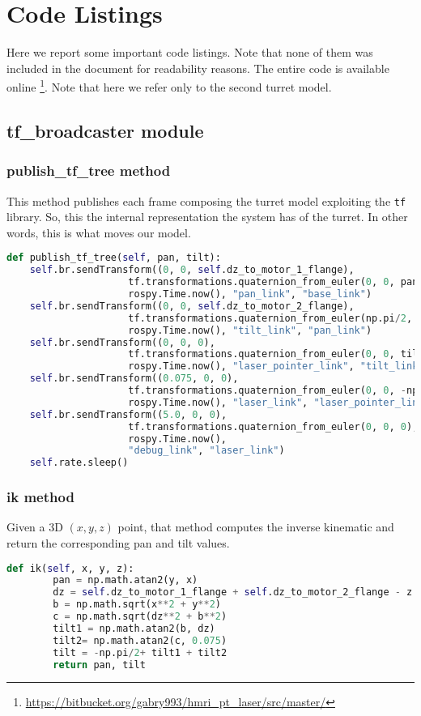 \chapter{Code Listings}

\label{Appen:B}
Here we report some important code listings. Note that none of them was included in the document for readability reasons. The entire code is available online \footnote{\url{https://bitbucket.org/gabry993/hmri_pt_laser/src/master/}}. Note that here we refer only to the second turret model.
\section*{tf\_broadcaster module}\label{sec:tfbroadcaster}
\subsection*{publish\_tf\_tree method}
This method publishes each frame composing the turret model exploiting the \texttt{tf} library. So, this the internal representation the system has of the turret. In other words, this is what moves our  model.
\begin{lstlisting}[caption={Publish Turret tf Tree},label={lst:tftree},language=Python]
def publish_tf_tree(self, pan, tilt):
    self.br.sendTransform((0, 0, self.dz_to_motor_1_flange),
                     tf.transformations.quaternion_from_euler(0, 0, pan),
                     rospy.Time.now(), "pan_link", "base_link")
    self.br.sendTransform((0, 0, self.dz_to_motor_2_flange),
                     tf.transformations.quaternion_from_euler(np.pi/2, -np.pi/2, 0),
                     rospy.Time.now(), "tilt_link", "pan_link")
    self.br.sendTransform((0, 0, 0),
                     tf.transformations.quaternion_from_euler(0, 0, tilt - np.pi/2),
                     rospy.Time.now(), "laser_pointer_link", "tilt_link")
    self.br.sendTransform((0.075, 0, 0),
                     tf.transformations.quaternion_from_euler(0, 0, -np.pi/2),
                     rospy.Time.now(), "laser_link", "laser_pointer_link")
    self.br.sendTransform((5.0, 0, 0),
                     tf.transformations.quaternion_from_euler(0, 0, 0),
                     rospy.Time.now(),
                     "debug_link", "laser_link")
    self.rate.sleep()
\end{lstlisting}
\subsection*{ik method}
Given a 3D $(x, y, z)$ point, that method computes the inverse kinematic and return the corresponding pan and tilt values.
\begin{lstlisting}[caption={Inverse Kinematic},label={lst:ik},language=Python]
def ik(self, x, y, z):
        pan = np.math.atan2(y, x)
        dz = self.dz_to_motor_1_flange + self.dz_to_motor_2_flange - z
        b = np.math.sqrt(x**2 + y**2)
        c = np.math.sqrt(dz**2 + b**2)
        tilt1 = np.math.atan2(b, dz)
        tilt2= np.math.atan2(c, 0.075)
        tilt = -np.pi/2+ tilt1 + tilt2
        return pan, tilt
\end{lstlisting}
